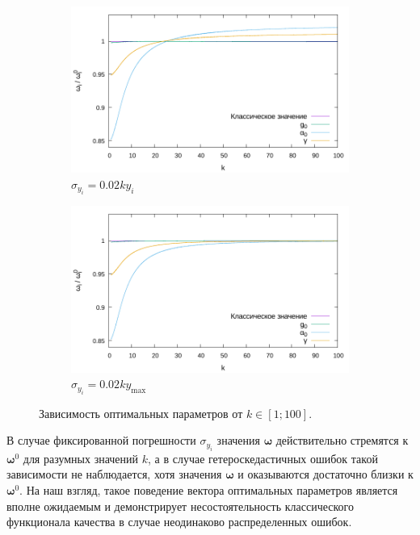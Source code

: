 \documentclass[tikz,10pt,a4paper]{article}
\newcommand{\bomega}{\boldsymbol{\omega}}
\begin{document}
\begin{figure}[h]
  \centering
  \begin{subfigure}[b]{0.5\textwidth}
    \includegraphics[width=\textwidth]{figs/levmar/convergence/convergence_1_100_0.01_yi.txt.pdf}
	\caption{$\sigma_{y_i} = 0.02ky_i$}
	\label{fig:conv_varY_100}
  \end{subfigure}%
  \begin{subfigure}[b]{0.5\textwidth}
    \includegraphics[width=\textwidth]{figs/levmar/convergence/convergence_1_100_0.01_ymax.txt.pdf}
	\caption{$\sigma_{y_i} = 0.02ky_{\max}$}
	\label{fig:conv_fixedY_100}
  \end{subfigure}
  \caption{Зависимость оптимальных параметров от $k \in [1; 100]$.}
  \label{fig:conv_varY}
\end{figure}

В случае фиксированной погрешности $\sigma_{y_i}$ значения $\bomega$
действительно стремятся к $\bomega^0$ для разумных значений $k$, а в случае
гетероскедастичных ошибок такой зависимости не наблюдается, хотя значения $\bomega$
и оказываются достаточно близки к $\bomega^0$. На наш взгляд, такое поведение
вектора оптимальных параметров является вполне ожидаемым и демонстрирует
несостоятельность классического функционала качества в случае неодинаково
распределенных ошибок.
\end{document}

